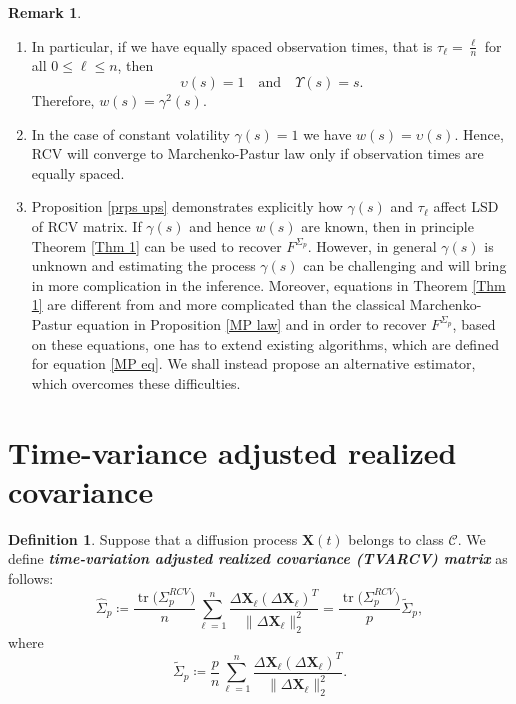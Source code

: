 \documentclass[a4paper,11pt]{book}
\theoremstyle{plain}
\theoremstyle{definition}
\newtheorem{defn}[thm]{Definition}
\newtheorem{rmrk}[thm]{Remark}
\newcommand{\tr}{\operatorname{tr}}
\newcommand{\define}[1]{\textit{\textbf{#1}}}
\begin{document}
    \begin{rmrk} \
    	\begin{enumerate}
    		\item In particular, if we have equally spaced observation times, that is $\tau_\ell = \frac{\ell}{n}$ for all $0 \leq \ell \leq n$,
    		then 
    		\[ \upsilon(s) = 1 \quad \text{and} \quad \Upsilon(s) = s.\]
    		Therefore,
    		$w(s) = \gamma^2(s).$
    		\item In the case of constant volatility $\gamma(s) = 1$ we have $w(s) = \upsilon(s)$. Hence, RCV will converge to Marchenko-Pastur law only if observation times are equally spaced.
    		\item Proposition \ref{prps ups} demonstrates explicitly how $\gamma(s)$ and $\tau_\ell$ affect LSD of RCV matrix. If $\gamma(s)$ and hence $w(s)$ are known, then in principle Theorem \ref{Thm 1} can be used to recover $F^{\Sigma_p}$. However, in general $\gamma(s)$ is unknown and estimating the process $\gamma(s)$ can be challenging and will bring in more complication in the inference. Moreover, equations in Theorem \ref{Thm 1} are different from and more complicated than the classical Marchenko-Pastur equation in Proposition \ref{MP law} and in order to recover $F^{\Sigma_p}$, based on these equations, one has to extend existing algorithms, which are defined for equation \eqref{MP eq}. We shall instead propose an alternative estimator, which overcomes these difficulties.
    	\end{enumerate}
    \end{rmrk}
    
    \section{Time-variance adjusted realized covariance}
    		
    \begin{defn}
   		Suppose that a diffusion process $\mathbf{X}(t)$ belongs to class $\mathcal{C}$. We define \define{time-variation adjusted realized covariance (TVARCV) matrix} as follows:
   		\begin{equation} \label{TVARCV}
   		\widehat{\Sigma}_p \coloneqq \frac{\tr \big( \Sigma_p^{RCV} \big) }{n} \sum_{\ell = 1}^{n} \frac{\Delta \mathbf{X}_\ell (\Delta \mathbf{X}_\ell)^T}{\| \Delta \mathbf{X}_\ell \|_2^2} = \frac{\tr \big( \Sigma_p^{RCV} \big) }{p} \widetilde{\Sigma}_p,
   		\end{equation}
   		where
   		\begin{equation} \label{Sigma_tilde}
   		\widetilde{\Sigma}_p \coloneqq \frac{p}{n} \sum_{\ell = 1}^{n} \frac{\Delta \mathbf{X}_\ell (\Delta \mathbf{X}_\ell)^T}{\| \Delta \mathbf{X}_\ell \|_2^2}.
   		\end{equation}
    \end{defn}
    
\end{document}
